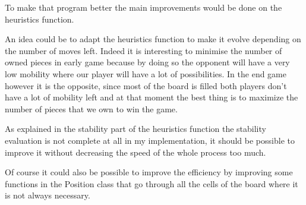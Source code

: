To make that program better the main improvements would be done on the heuristics function.

An idea could be to adapt the heuristics function to make it evolve depending on the number of moves left.
Indeed it is interesting to minimise the number of owned pieces in early game because by doing so the opponent will have a very low mobility where our player will have a lot of possibilities.
In the end game however it is the opposite, since most of the board is filled both players don't have a lot of mobility left and at that moment the best thing is to maximize the number of pieces that we own to win the game.

As explained in the stability part of the heuristics function the stability evaluation is not complete at all in my implementation, it should be possible to improve it without decreasing the speed of the whole process too much.

Of course it could also be possible to improve the efficiency by improving some functions in the Position class that go through all the cells of the board where it is not always necessary.
